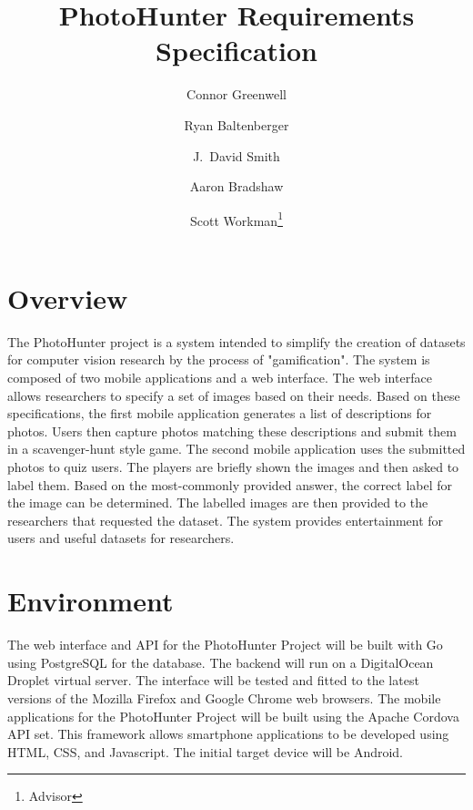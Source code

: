 \documentclass{article}
\title{PhotoHunter Requirements Specification
}
\author{Connor Greenwell \and Ryan Baltenberger
  \and J.\ David Smith \and Aaron Bradshaw
  \and Scott Workman\footnote{Advisor}}
\begin{document}
\maketitle

\section{Overview}
The PhotoHunter project is a system intended to simplify the creation of
datasets for computer vision research by the process of "gamification". The
system is composed of two mobile applications and a web interface. The web
interface allows researchers to specify a set of images based on their needs.
Based on these specifications, the first mobile application generates a list of
descriptions for photos. Users then capture photos matching these descriptions
and submit them in a scavenger-hunt style game. The second mobile application
uses the submitted photos to quiz users. The players are briefly shown the
images and then asked to label them. Based on the most-commonly provided
answer, the correct label for the image can be determined. The labelled images
are then provided to the researchers that requested the dataset. The system
provides entertainment for users and useful datasets for researchers.

\section{Environment}
The web interface and API for the PhotoHunter Project will be built with Go using PostgreSQL for the database. The backend will run on a DigitalOcean Droplet virtual server. The interface will be tested and fitted to the latest versions of the Mozilla Firefox and Google Chrome web browsers. The mobile applications for the PhotoHunter Project will be built using the Apache Cordova API set. This framework allows smartphone applications to be developed using HTML, CSS, and Javascript. The initial target device will be Android.
\end{document}
